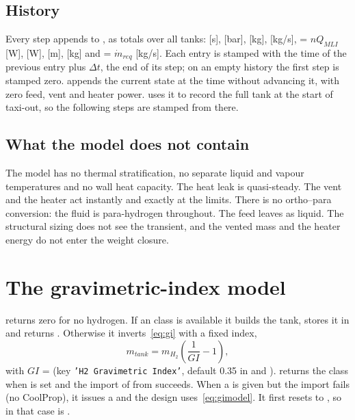 \documentclass[a4paper,11pt]{article}
\newcommand{\Qmli}{Q_{MLI}}
\newcommand{\mdot}{\dot m}
\begin{document}
\subsection{History}
Every step appends to , as totals over all tanks:  [s], 
[bar],  [kg],  [kg/s],  = $n\Qmli$ [W],  [W],
 [m],  [kg] and  = $\mdot_{req}$ [kg/s]. Each
entry is stamped with the time of the previous entry plus $\Delta t$, the end of its step;
on an empty history the first step is stamped zero.  appends the
current state at the time  without advancing it, with zero feed, vent and heater
power.  uses it to record the full tank at the start of
taxi-out, so the following steps are stamped from there.

\subsection{What the model does not contain}
The model has no thermal stratification, no separate liquid and vapour temperatures and no
wall heat capacity. The heat leak is quasi-steady. The vent and the heater act instantly and
exactly at the limits. There is no ortho--para conversion: the fluid is para-hydrogen
throughout. The feed leaves as liquid. The structural sizing does not see the transient, and the
vented mass and the heater energy do not enter the weight closure.

\section{The gravimetric-index model}\label{sec:gi}

 returns zero for no hydrogen. If
an  class is available it builds the tank, stores it in  and
returns . Otherwise it inverts~\eqref{eq:gi} with a fixed index,
\begin{equation}
  m_{tank} = m_{H_2}\left(\frac{1}{GI} - 1\right),
  \label{eq:gimodel}
\end{equation}
with $GI$ =  (key \texttt{'H2 Gravimetric Index'},
default 0.35 in  and ).
 returns the class when  is set and
the import of  from  succeeds. When a
 is given but the import fails (no CoolProp), it issues a
 and the design uses~\eqref{eq:gimodel}. It first resets
 to , so in that case  is .
\end{document}
